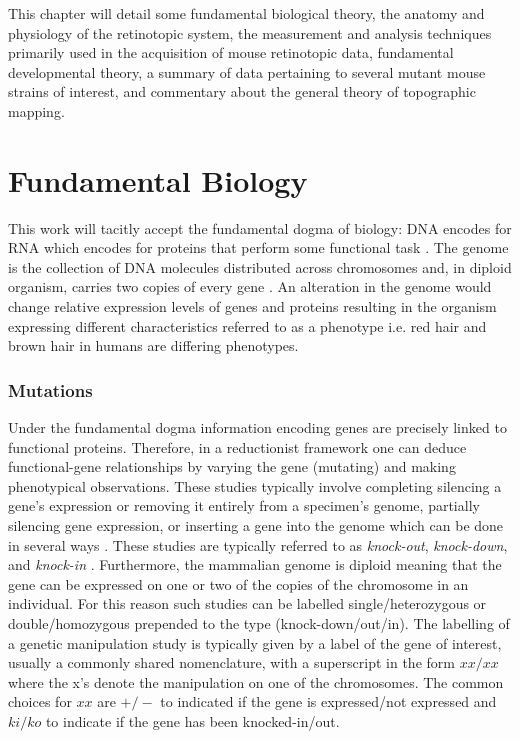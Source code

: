 This chapter will detail some fundamental biological theory, the anatomy and physiology of the retinotopic system, the measurement and analysis techniques primarily used in the acquisition of mouse retinotopic data, fundamental developmental theory, a summary of data pertaining to several mutant mouse strains of interest, and commentary about the general theory of topographic mapping.

\section{Fundamental Biology  \label{section:genemutations}}
This work will tacitly accept the fundamental dogma of biology: DNA encodes for RNA which encodes for proteins that perform some functional task \cite{Alberts2002-rr}. The genome is the collection of DNA molecules distributed across chromosomes and, in diploid organism, carries two copies of every gene \cite{Alberts2002-rr}. An alteration in the genome would change relative expression levels of genes and proteins resulting in the organism expressing different characteristics referred to as a phenotype i.e. red hair and brown hair in humans are differing phenotypes.
\subsubsection{Mutations}
Under the fundamental dogma information encoding genes are precisely linked to functional proteins. Therefore, in a reductionist framework one can deduce functional-gene relationships by varying the gene (mutating) and making phenotypical observations. These studies typically involve completing silencing a gene's expression or removing it entirely from a specimen's genome, partially silencing gene expression, or inserting a gene into the genome which can be done in several ways \cite{Doyle2012-jo, Kumar2009-uz, Adli2018-ng}. These studies are typically referred to as \textit{knock-out}, \textit{knock-down}, and \textit{knock-in} \cite{Doyle2012-jo}. Furthermore, the mammalian genome is diploid meaning that the gene can be expressed on one or two of the copies of the chromosome in an individual. For this reason such studies can be labelled single/heterozygous or double/homozygous prepended to the type (knock-down/out/in). The labelling of a genetic manipulation study is typically given by a label of the gene of interest, usually a commonly shared nomenclature, with a superscript in the form $xx/xx$ where the x's denote the manipulation on one of the chromosomes. The common choices for $xx$ are $+/-$ to indicated if the gene is expressed/not expressed and $ki/ko$ to indicate if the gene has been knocked-in/out.
